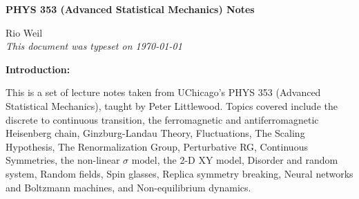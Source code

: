\documentclass[10pt]{article}
\begin{document}
\begin{tcolorbox}
  \begin{center}
  \begin{Large}
    \textbf{PHYS 353 (Advanced Statistical Mechanics) Notes} \\
    \vspace{5pt}
  \end{Large}
  \begin{large}
        Rio Weil \\
\vspace{5pt}
    \emph{This document was typeset on \today}
  \end{large}
  \end{center}
\end{tcolorbox}

\begin{center}
  \textbf{Introduction:}

  This is a set of lecture notes taken from UChicago's PHYS 353 (Advanced Statistical Mechanics), taught by Peter Littlewood. Topics covered include the discrete to continuous transition, the ferromagnetic and antiferromagnetic Heisenberg chain, Ginzburg-Landau Theory, Fluctuations, The Scaling Hypothesis, The Renormalization Group, Perturbative RG, Continuous Symmetries, the non-linear $\sigma$ model, the 2-D XY model, Disorder and random system, Random fields, Spin glasses, Replica symmetry breaking, Neural networks and Boltzmann machines, and Non-equilibrium dynamics.
  
\end{center}
\tableofcontents

\newpage
















\end{document}

